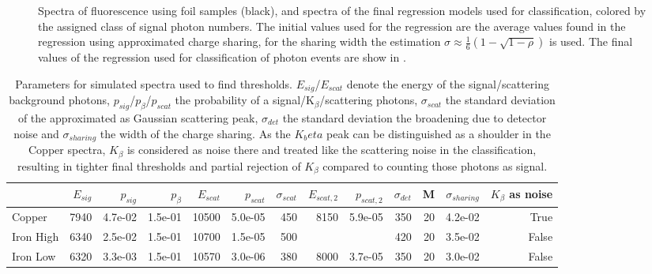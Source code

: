 \begin{figure}[h!]
\begin{subfigure}[b]{0.32\textwidth}
	\end{subfigure}
	\caption[Spectra of fluorescence using foil samples with photon number classes]{Spectra of fluorescence using foil samples (black), and spectra of the final regression models used for classification, colored by the assigned class of signal photon numbers. The initial values used for the regression are the average values found in the regression using approximated charge sharing, for the sharing width the estimation $\sigma\approx\frac{1}{6} \left(1-\sqrt{1-\rho }\right)$ is used.  The final values of the regression used for classification of photon events are show in .}
	\label{fig:thresholdsfoil}
\end{figure}


\FloatBarrier
\begin{table}[h!]
	\centering
	\caption[Parameters for simulated spectra used to find thresholds]{Parameters for simulated spectra used to find thresholds. $E_{sig}$/$E_{scat}$ denote the energy of the signal/scattering background photons, $p_{sig}$/$p_{\beta}$/$p_{scat}$ the probability of a signal/K$_{\beta}$/scattering photons, $\sigma_{scat}$ the standard deviation of the approximated as Gaussian scattering peak, $\sigma_{det}$ the standard deviation the broadening due to detector noise and $\sigma_{sharing}$ the width of the charge sharing.  As the $K_beta$ peak can be distinguished as a shoulder in the Copper spectra, $K_{\beta}$ is considered as noise there and treated like the scattering noise in the classification, resulting in tighter final thresholds and partial rejection of  $K_{\beta}$ compared to counting those photons as signal.}
	\label{tab:fitvalues}
	\scriptsize
	\begin{adjustwidth}{-2em}{-2em}	
		\begin{tabular}{lrrrrrrrrrrrr}
			
			\toprule
			{} &  $E_{sig}$ &  $p_{sig}$ &  $p_{\beta}$ &  $E_{scat}$ &  $p_{scat}$ &  $\sigma_{scat}$ & $E_{scat,2}$ & $p_{scat,2}$ &  $\sigma_{det}$ &   M &  $\sigma_{sharing}$ &  $K_{\beta}$ as noise \\	\midrule
			Copper &          7940 &       4.7e-02 &     1.5e-01 &          10500 &        5.0e-05 &                 450 &           8150 &        5.9e-05 &             350 &  20 &             4.2e-02 &                  True \\
			Iron High         &          6340 &       2.5e-02 &     1.5e-01 &          10700 &        1.5e-05 &                 500 &                &                &             420 &  20 &             3.5e-02 &                 False \\
			Iron Low          &          6320 &       3.3e-03 &     1.5e-01 &          10570 &        3.0e-06 &                 380 &           8000 &        3.7e-05 &             350 &  20 &             3.0e-02 &                 False \\
			\bottomrule
		\end{tabular}
	\end{adjustwidth}
\end{table}


